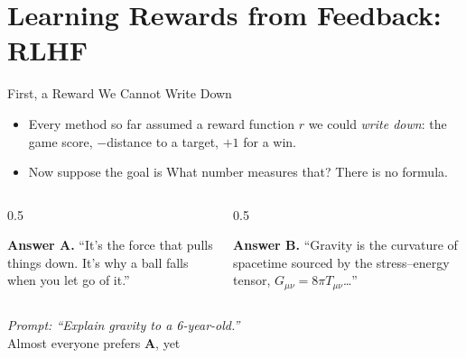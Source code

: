 \section{Learning Rewards from Feedback: RLHF}

\begin{frame}{First, a Reward We Cannot Write Down}
\begin{itemize}\itemsep0.5em
    \item Every method so far assumed a reward function $r$ we could
          \emph{write down}: the game score, $-$distance to a target, $+1$ for a
          win.
    \item Now suppose the goal is  What number measures that? There is no formula.
\end{itemize}
\vspace{0.5em}
\begin{columns}[T]
\begin{column}{0.5\textwidth}\centering
\setlength{\fboxsep}{6pt}%
\colorbox{boxgreen!50}{\parbox{0.92\linewidth}{\footnotesize
\textbf{Answer A.} ``It's the force that pulls things down. It's why a ball
falls when you let go of it.''}}
\end{column}
\begin{column}{0.5\textwidth}\centering
\setlength{\fboxsep}{6pt}%
\colorbox{boxred!40}{\parbox{0.92\linewidth}{\footnotesize
\textbf{Answer B.} ``Gravity is the curvature of spacetime sourced by the
stress--energy tensor, $G_{\mu\nu} = 8\pi T_{\mu\nu}$\dots''}}
\end{column}
\end{columns}
\vspace{0.5em}
\begin{center}\small
\emph{Prompt: ``Explain gravity to a 6-year-old.''}\\
Almost everyone prefers \textbf{A}, yet 
\end{center}
\end{frame}

